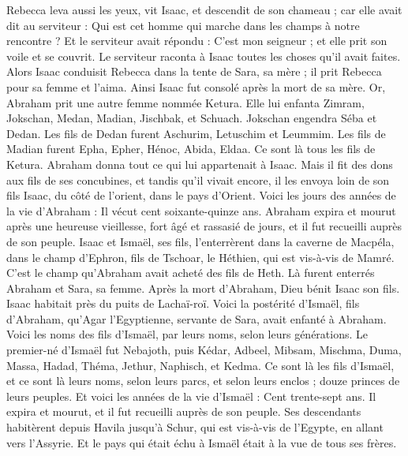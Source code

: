 \begin{multicols}{2}
Rebecca leva aussi les yeux, vit Isaac, et descendit de son chameau ;
car elle avait dit au serviteur : Qui est cet homme qui marche dans les champs à notre rencontre ? Et le serviteur avait répondu : C'est mon seigneur ; et elle prit son voile et se couvrit.
Le serviteur raconta à Isaac toutes les choses qu'il avait faites.
Alors Isaac conduisit Rebecca dans la tente de Sara, sa mère ; il prit Rebecca pour sa femme et l'aima. Ainsi Isaac fut consolé après la mort de sa mère.
\VerseOne{}Or, Abraham prit une autre femme nommée Ketura.
Elle lui enfanta Zimram, Jokschan, Medan, Madian, Jischbak, et Schuach.
Jokschan engendra Séba et Dedan. Les fils de Dedan furent Aschurim, Letuschim et Leummim.
Les fils de Madian furent Epha, Epher, Hénoc, Abida, Eldaa. Ce sont là tous les fils de Ketura.
Abraham donna tout ce qui lui appartenait à Isaac.
Mais il fit des dons aux fils de ses concubines, et tandis qu’il vivait encore, il les envoya loin de son fils Isaac, du côté de l'orient, dans le pays d’Orient.
Voici les jours des années de la vie d’Abraham : Il vécut cent soixante-quinze ans.
Abraham expira et mourut après une heureuse vieillesse, fort âgé et rassasié de jours, et il fut recueilli auprès de son peuple.
Isaac et Ismaël, ses fils, l'enterrèrent dans la caverne de Macpéla, dans le champ d'Ephron, fils de Tschoar, le Héthien, qui est vis-à-vis de Mamré.
C’est le champ qu'Abraham avait acheté des fils de Heth. Là furent enterrés Abraham et Sara, sa femme.
Après la mort d'Abraham, Dieu bénit Isaac son fils.  Isaac habitait près du puits de Lachaï-roï.
Voici la postérité d'Ismaël, fils d'Abraham, qu'Agar l’Egyptienne, servante de Sara, avait enfanté à Abraham.
Voici les noms des fils d'Ismaël, par leurs noms, selon leurs générations. Le premier-né d'Ismaël fut Nebajoth, puis Kédar, Adbeel, Mibsam,
Mischma, Duma, Massa,
Hadad, Théma, Jethur, Naphisch, et Kedma.
Ce sont là les fils d'Ismaël, et ce sont là leurs noms, selon leurs parcs, et selon leurs enclos ; douze princes de leurs peuples.
Et voici les années de la vie d'Ismaël : Cent trente-sept ans. Il expira et mourut, et il fut recueilli auprès de son peuple.
Ses descendants habitèrent depuis Havila jusqu'à Schur, qui est vis-à-vis de l'Egypte, en allant vers l'Assyrie. Et le pays qui était échu à Ismaël était à la vue de tous ses frères.

\end{multicols}
